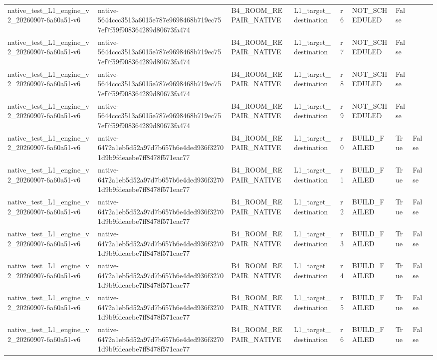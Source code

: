 \begin{tabular}{lllllllll}
native\_test\_L1\_engine\_v2\_20260907-6a60a51-v6 & native-5644ccc3513a6015e787e9698468b719ec757ef7f59f908364289d80673fa474 & B4\_ROOM\_REPAIR\_NATIVE & L1\_target\_destination & r6 & NOT\_SCHEDULED & False &  &  \\
native\_test\_L1\_engine\_v2\_20260907-6a60a51-v6 & native-5644ccc3513a6015e787e9698468b719ec757ef7f59f908364289d80673fa474 & B4\_ROOM\_REPAIR\_NATIVE & L1\_target\_destination & r7 & NOT\_SCHEDULED & False &  &  \\
native\_test\_L1\_engine\_v2\_20260907-6a60a51-v6 & native-5644ccc3513a6015e787e9698468b719ec757ef7f59f908364289d80673fa474 & B4\_ROOM\_REPAIR\_NATIVE & L1\_target\_destination & r8 & NOT\_SCHEDULED & False &  &  \\
native\_test\_L1\_engine\_v2\_20260907-6a60a51-v6 & native-5644ccc3513a6015e787e9698468b719ec757ef7f59f908364289d80673fa474 & B4\_ROOM\_REPAIR\_NATIVE & L1\_target\_destination & r9 & NOT\_SCHEDULED & False &  &  \\
native\_test\_L1\_engine\_v2\_20260907-6a60a51-v6 & native-6472a1eb5d52a97d7b657b6e4ded936f32701d9b9fdeaebe7ff8478f571eac77 & B4\_ROOM\_REPAIR\_NATIVE & L1\_target\_destination & r0 & BUILD\_FAILED & True & False &  \\
native\_test\_L1\_engine\_v2\_20260907-6a60a51-v6 & native-6472a1eb5d52a97d7b657b6e4ded936f32701d9b9fdeaebe7ff8478f571eac77 & B4\_ROOM\_REPAIR\_NATIVE & L1\_target\_destination & r1 & BUILD\_FAILED & True & False &  \\
native\_test\_L1\_engine\_v2\_20260907-6a60a51-v6 & native-6472a1eb5d52a97d7b657b6e4ded936f32701d9b9fdeaebe7ff8478f571eac77 & B4\_ROOM\_REPAIR\_NATIVE & L1\_target\_destination & r2 & BUILD\_FAILED & True & False &  \\
native\_test\_L1\_engine\_v2\_20260907-6a60a51-v6 & native-6472a1eb5d52a97d7b657b6e4ded936f32701d9b9fdeaebe7ff8478f571eac77 & B4\_ROOM\_REPAIR\_NATIVE & L1\_target\_destination & r3 & BUILD\_FAILED & True & False &  \\
native\_test\_L1\_engine\_v2\_20260907-6a60a51-v6 & native-6472a1eb5d52a97d7b657b6e4ded936f32701d9b9fdeaebe7ff8478f571eac77 & B4\_ROOM\_REPAIR\_NATIVE & L1\_target\_destination & r4 & BUILD\_FAILED & True & False &  \\
native\_test\_L1\_engine\_v2\_20260907-6a60a51-v6 & native-6472a1eb5d52a97d7b657b6e4ded936f32701d9b9fdeaebe7ff8478f571eac77 & B4\_ROOM\_REPAIR\_NATIVE & L1\_target\_destination & r5 & BUILD\_FAILED & True & False &  \\
native\_test\_L1\_engine\_v2\_20260907-6a60a51-v6 & native-6472a1eb5d52a97d7b657b6e4ded936f32701d9b9fdeaebe7ff8478f571eac77 & B4\_ROOM\_REPAIR\_NATIVE & L1\_target\_destination & r6 & BUILD\_FAILED & True & False &  \\

\end{tabular}
